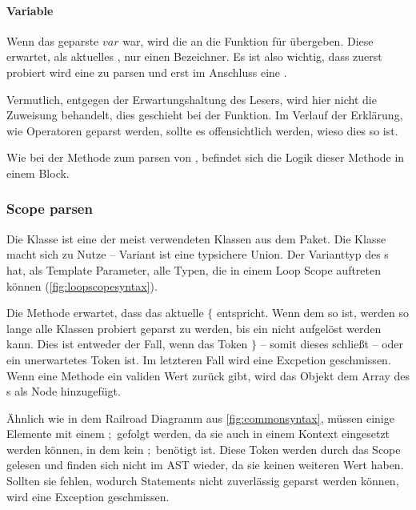 {{      \paragraph{Variable}
        Wenn das geparste  \myRIn$var$ war, wird die  an die Funktion für  übergeben. Diese erwartet, als aktuelles , nur einen Bezeichner. Es ist also wichtig, dass zuerst probiert wird eine  zu parsen und erst im Anschluss eine .

        Vermutlich, entgegen der Erwartungshaltung des Lesers, wird hier nicht die Zuweisung behandelt, dies geschieht bei der  Funktion. Im Verlauf der Erklärung, wie Operatoren geparst werden, sollte es offensichtlich werden, wieso dies so ist.

        Wie bei der Methode zum parsen von , befindet sich die Logik dieser Methode in einem  Block.

    \subsubsection{Scope parsen}
    \label{sssec:Scope parsen}
      Die  Klasse ist eine der meist verwendeten Klassen aus dem  Paket. Die  Klasse macht sich  \autocite{cpp-variant} zu Nutze -- Variant ist eine typsichere Union. Der Varianttyp des s hat, als Template Parameter, alle  Typen, die in einem Loop Scope auftreten können (\autoref{fig:loopscopesyntax}).

      Die  Methode erwartet, dass das aktuelle  \myRIn$\{$ entspricht. Wenn dem so ist, werden so lange alle  Klassen probiert geparst zu werden, bis ein  nicht aufgelöst werden kann. Dies ist entweder der Fall, wenn das Token \myRIn$\}$ -- somit dieses  schließt -- oder ein unerwartetes Token ist. Im letzteren Fall wird eine Excpetion geschmissen. Wenn eine Methode ein validen Wert zurück gibt, wird das Objekt dem Array des s als Node hinzugefügt.

      Ähnlich wie in dem Railroad Diagramm aus \autoref{fig:commonsyntax}, müssen einige  Elemente mit einem \myRIn$;$ gefolgt werden, da sie auch in einem Kontext eingesetzt werden können, in dem kein \myRIn$;$ benötigt ist. Diese Token werden durch das Scope gelesen und finden sich nicht im AST wieder, da sie keinen weiteren Wert haben. Sollten sie fehlen, wodurch Statements nicht zuverlässig geparst werden können, wird eine Exception geschmissen.

}}
